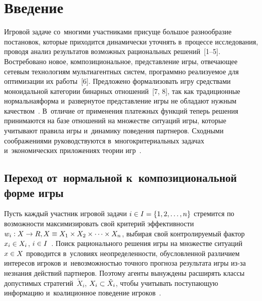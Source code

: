   
\vspace*{2pt}



\thispagestyle{headings}

\begin{multicols}{2}

\label{st\stat}
    
\section{Введение}

    Игровой задаче со~многими участниками присуще большое разнообразие 
по\-ста\-но\-вок, которые приходится динамически уточ\-нять в~процессе исследования, 
проводя анализ результатов воз\-мож\-ных рациональных решений~[1--5]. 
Востребовано новое, композициональное, пред\-став\-ле\-ние игры, от\-ве\-ча\-ющее сетевым 
технологиям мультиагентных сис\-тем, программно ре\-а\-ли\-зу\-емое для оптимизации их 
работы~[6]. Предложено формализовать игру средствами моноидальной категории 
бинарных отношений~[7, 8], так как традиционные нормальная\linebreak форма и~развернутое 
представление игры не обладают нуж\-ным качеством~\cite{1-vas, 9-vas}. В~отличие 
от применения платежных функ\-ций теперь решения принимаются на базе 
отношений на множестве \mbox{ситуаций} игры, которые учитывают правила игры 
и~динамику поведения парт\-не\-ров. Сход\-ны\-ми соображениями руководствуются 
в~многокритериальных задачах~\cite{3-vas} и~экономических приложениях тео\-рии 
игр~\cite{4-vas, 10-vas, 11-vas}. 
    
    \subsection*{Переход от~нормальной к~композициональной форме 
игры}

    Пусть каждый участник игровой задачи $i\hm \in I\hm= \{1, 2, \ldots ,n\}$ 
стремится по воз\-мож\-ности максимизировать свой критерий эф\-фек\-тив\-ности $w_i: 
X\hm\to R, X\hm\equiv X_1\times X_2\times \cdots \times X_n$, выбирая свой 
конт\-ро\-ли\-ру\-емый фактор $x_i\hm\in X_i$, $i\hm\in I$~\cite{1-vas, 2-vas, 5-vas}. Поиск 
рационального решения игры на множестве ситуаций $x\hm\in X$ проводится 
в~условиях не\-опре\-де\-лен\-ности, обуслов\-лен\-ной различием интересов игроков 
и~не\-воз\-мож\-ностью точ\-но\-го прогноза результата игры из-за незнания действий 
парт\-не\-ров. Поэтому агенты вы\-нуж\-де\-ны расширять классы до\-пус\-ти\-мых 
стратегий~$\tilde{X}_i$, $X_i\hm\subset \tilde{X}_i$, чтобы учитывать по\-сту\-па\-ющую 
информацию и~коалиционное поведение игроков~\cite{1-vas, 5-vas}. 


\end{multicols}

